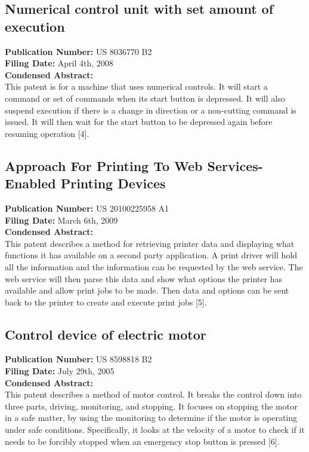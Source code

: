 \subsection{Numerical control unit with set amount of execution}

\textbf{Publication Number:} US 8036770 B2 \\
\textbf{Filing Date:} April 4th, 2008 \\
\textbf{Condensed Abstract:} \\
This patent is for a machine that uses numerical controls. 
It will start a command or set of commands when its start button is depressed. 
It will also suspend execution if there is a change in direction or a non-cutting command is issued. 
It will then wait for the start button to be depressed again before resuming operation [4]. 

\subsection{Approach For Printing To Web Services-Enabled Printing Devices}

\textbf{Publication Number:} US 20100225958 A1 \\
\textbf{Filing Date:} March 6th, 2009 \\
\textbf{Condensed Abstract:} \\
This patent describes a method for retrieving printer data and displaying what functions it has available on a second party application.  
A print driver will hold all the information and the information can be requested by the web service. 
The web service will then parse this data and show what options the printer has available and allow print jobs to be made. 
Then data and options can be sent back to the printer to create and execute print jobs [5].

\subsection{Control device of electric motor}

\textbf{Publication Number:} US 8598818 B2 \\
\textbf{Filing Date:} July 29th, 2005 \\
\textbf{Condensed Abstract:} \\
This patent describes a method of motor control. 
It breaks the control down into three parts, driving, monitoring, and stopping. 
It focuses on stopping the motor in a safe matter, by using the monitoring to determine if the motor is operating under safe conditions. 
Specifically, it looks at the velocity of a motor to check if it needs to be forcibly stopped when an emergency stop button is pressed [6].

